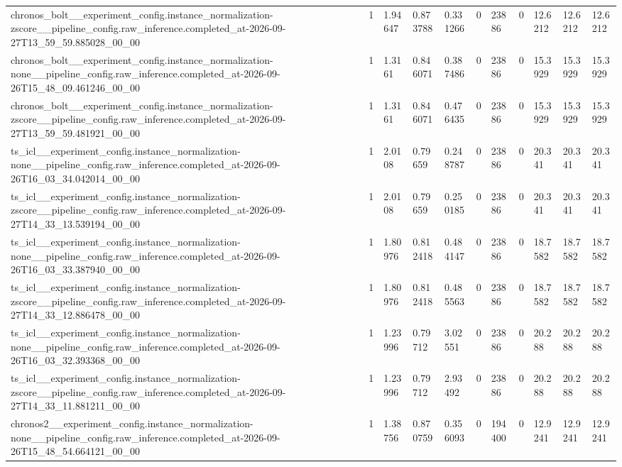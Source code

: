 \begin{tabular}{lllllllllll}
chronos\_bolt\_\_experiment\_config.instance\_normalization-zscore\_\_pipeline\_config.raw\_inference.completed\_at-2026-09-27T13\_59\_59.885028\_00\_00 & 1 & 1.94647 & 0.873788 & 0.331266 & 0 & 23886 & 0 & 12.6212 & 12.6212 & 12.6212 \\
chronos\_bolt\_\_experiment\_config.instance\_normalization-none\_\_pipeline\_config.raw\_inference.completed\_at-2026-09-26T15\_48\_09.461246\_00\_00 & 1 & 1.3161 & 0.846071 & 0.387486 & 0 & 23886 & 0 & 15.3929 & 15.3929 & 15.3929 \\
chronos\_bolt\_\_experiment\_config.instance\_normalization-zscore\_\_pipeline\_config.raw\_inference.completed\_at-2026-09-27T13\_59\_59.481921\_00\_00 & 1 & 1.3161 & 0.846071 & 0.476435 & 0 & 23886 & 0 & 15.3929 & 15.3929 & 15.3929 \\
ts\_icl\_\_experiment\_config.instance\_normalization-none\_\_pipeline\_config.raw\_inference.completed\_at-2026-09-26T16\_03\_34.042014\_00\_00 & 1 & 2.0108 & 0.79659 & 0.248787 & 0 & 23886 & 0 & 20.341 & 20.341 & 20.341 \\
ts\_icl\_\_experiment\_config.instance\_normalization-zscore\_\_pipeline\_config.raw\_inference.completed\_at-2026-09-27T14\_33\_13.539194\_00\_00 & 1 & 2.0108 & 0.79659 & 0.250185 & 0 & 23886 & 0 & 20.341 & 20.341 & 20.341 \\
ts\_icl\_\_experiment\_config.instance\_normalization-none\_\_pipeline\_config.raw\_inference.completed\_at-2026-09-26T16\_03\_33.387940\_00\_00 & 1 & 1.80976 & 0.812418 & 0.484147 & 0 & 23886 & 0 & 18.7582 & 18.7582 & 18.7582 \\
ts\_icl\_\_experiment\_config.instance\_normalization-zscore\_\_pipeline\_config.raw\_inference.completed\_at-2026-09-27T14\_33\_12.886478\_00\_00 & 1 & 1.80976 & 0.812418 & 0.485563 & 0 & 23886 & 0 & 18.7582 & 18.7582 & 18.7582 \\
ts\_icl\_\_experiment\_config.instance\_normalization-none\_\_pipeline\_config.raw\_inference.completed\_at-2026-09-26T16\_03\_32.393368\_00\_00 & 1 & 1.23996 & 0.79712 & 3.02551 & 0 & 23886 & 0 & 20.288 & 20.288 & 20.288 \\
ts\_icl\_\_experiment\_config.instance\_normalization-zscore\_\_pipeline\_config.raw\_inference.completed\_at-2026-09-27T14\_33\_11.881211\_00\_00 & 1 & 1.23996 & 0.79712 & 2.93492 & 0 & 23886 & 0 & 20.288 & 20.288 & 20.288 \\
chronos2\_\_experiment\_config.instance\_normalization-none\_\_pipeline\_config.raw\_inference.completed\_at-2026-09-26T15\_48\_54.664121\_00\_00 & 1 & 1.38756 & 0.870759 & 0.356093 & 0 & 194400 & 0 & 12.9241 & 12.9241 & 12.9241 \\

\end{tabular}
